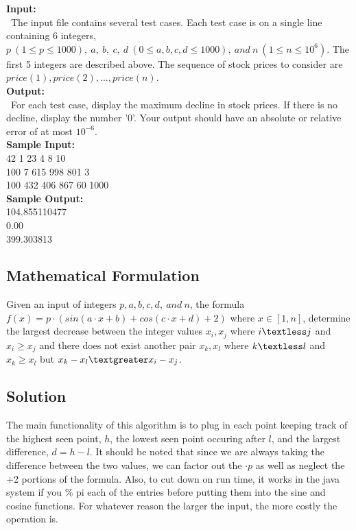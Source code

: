 \documentclass[12pt]{article}
\begin{document}
\noindent \textbf{Input:} \\
~\indent The input file contains several test cases. Each test case is on a single line containing 6 integers,
$p\ (1 \leq p \leq 1000),\ a,\ b,\ c,\ d\ (0 \leq a,b,c,d \leq 1000),\ and\ n\ (1 \leq n \leq 10^6)$. The first
5 integers are described above. The sequence of stock prices to consider are $price(1), price(2),..., price(n).$ \\

\noindent \textbf{Output:} \\
~\indent For each test case, display the maximum decline in stock prices. If there is no decline, display the
number '0'. Your output should have an absolute or relative error of at most $10^{-6}$. \\

\noindent \textbf{Sample Input:} \\
42 1 23 4 8 10  \\
100 7 615 998 801 3  \\
100 432 406 867 60 1000  \\

\noindent \textbf{Sample Output:} \\
104.855110477  \\
0.00           \\
399.303813


\newpage

\subsection{Mathematical Formulation}
Given an input of integers $p, a, b, c, d,\ and\ n$, the formula
$f(x) = p\cdot (sin(a\cdot x + b) + cos(c\cdot x + d) + 2)$ where $x \in [1, n]$, determine the largest
decrease between the integer values $x_i, x_j$ where $i \textless j$ and $x_i \geq x_j$ and there does
not exist another pair $x_k, x_l$ where $k \textless l$ and $x_k \geq x_l$ but $x_k - x_l \textgreater x_i - x_j$.


\subsection{Solution}
The main functionality of this algorithm is to plug in each point keeping track of the highest seen point, $h$,
the lowest seen point occuring after $l$, and the largest difference, $d = h-l$. It should be noted that since
we are always taking the difference between the two values, we can factor out the $\cdot p$ as well as neglect
the +2 portions of the formula. Also, to cut down on run time, it works in the java system if you \% pi each of
the entries before putting them into the sine and cosine functions. For whatever reason the larger the input,
the more costly the operation is.
\end{document}
